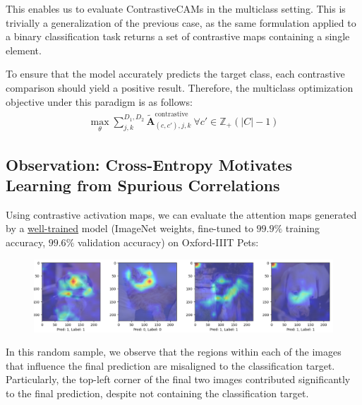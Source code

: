 \documentclass{article}
\theoremstyle{plain}
\theoremstyle{definition}
\theoremstyle{remark}
\begin{document}
This enables us to evaluate ContrastiveCAMs in the multiclass setting. This is trivially a generalization of the previous case, as the same formulation applied to a binary classification task returns a set of contrastive maps containing a single element.

To ensure that the model accurately predicts the target class, each contrastive comparison should yield a positive result. Therefore, the multiclass optimization objective under this paradigm is as follows:
\begin{gather}
	\max_{\theta} \sum^{D_1,D_2}_{j,k}\tilde{\mathcal{\bm{A}}}_{(c, c'),j,k}^{\text{contrastive}}\ \forall c' \in \mathbb{Z}_{+}(|C| - 1)
\end{gather}

\subsection{Observation: Cross-Entropy Motivates Learning from Spurious Correlations}

Using contrastive activation maps, we can evaluate the attention maps generated by a \underline{well-trained} model (ImageNet weights, fine-tuned to $99.9\%$ training accuracy, $99.6\%$ validation accuracy) on Oxford-IIIT Pets:

\begin{figure}[h!]
	\centering
	\includegraphics[width=\textwidth]{img/default_cams.png}
\end{figure}

In this random sample, we observe that the regions within each of the images that influence the final prediction are misaligned to the classification target. Particularly, the top-left corner of the final two images contributed significantly to the final prediction, despite not containing the classification target.
\end{document}
